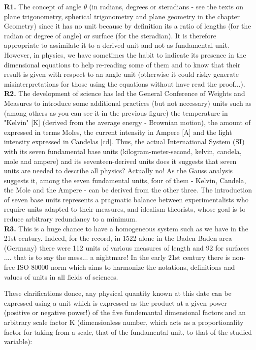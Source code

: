	 \begin{tcolorbox}[title=Remarks,colframe=black,arc=10pt]
	\textbf{R1.} The concept of angle $\theta$ (in radians, degrees or steradians - see the texts on plane trigonometry, spherical trigonometry and plane geometry in the chapter Geometry) since it has no unit because by definition its a ratio of lengths (for the radian or degree of angle) or surface (for the steradian). It is therefore appropriate to assimilate it to a derived unit and not as fundamental unit. However, in physics, we have sometimes the habit to indicate its presence in the dimensional equations to help re-reading some of them and to know that their result is given with respect to an angle unit (otherwise it could risky generate misinterpretations for those using the equations without have read the proof...).\\
	
	\textbf{R2.} The development of science has led the General Conference of Weights and Measures to introduce some additional practices (but not necessary) units such as (among others as you can see it in the previous figure) the temperature in "Kelvin" [K] (derived from the average energy - Brownian motion), the amount of expressed in terms Moles, the current intensity in Ampere [A] and the light intensity expressed in Candelas [cd]. Thus, the actual International System (SI) with its seven fundamental base units (kilogram-meter-second, kelvin, candela, mole and ampere) and its seventeen-derived units does it suggests that seven units are needed to describe all physics? Actually no! As the Gauss analysis suggests it, among the seven fundamental units, four of them - Kelvin, Candela, the Mole and the Ampere - can be derived from the other three. The introduction of seven base units represents a pragmatic balance between experimentalists who require units adapted to their measures, and idealism theorists, whose goal is to reduce arbitrary redundancy to a minimum.\\
	
	\textbf{R3.} This is a huge chance to have a homogeneous system such as we have in the 21st century. Indeed, for the record, in 1522 alone in the Baden-Baden area (Germany) there were 112 units of various measures of length and 92 for surfaces .... that is to say the mess... a nightmare! In the early 21st century there is non-free ISO 80000 norm which aims to harmonize the notations, definitions and values of units in all fields of sciences.
	\end{tcolorbox}
	These clarifications donce, any physical quantity known at this date can be expressed using a unit which is expressed as the product at a given power (positive or negative power!) of the five fundemantal dimensional factors and an arbitrary scale factor $ $K (dimensionless number, which acts as a proportionality factor for taking from a scale, that of the fundamental unit, to that of the studied variable):
	
